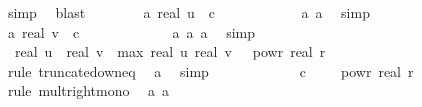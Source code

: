 \begin{isabellebody}
\ simp\ \isamarkupfalse%
\ blast\isanewline
\isanewline
\ \ \ \ \ \ \isamarkupfalse%
\ a{\isacharunderscore}{\kern0pt}{}{\isacharcolon}{\kern0pt}\ {\isachardoublequoteopen}real\ u\ {\isasymle}\ c\ {\isacharasterisk}{\kern0pt}\ {}{\isachardoublequoteclose}\isanewline
\ \ \ \ \ \ \ \ \isamarkupfalse%
\ a{\isacharunderscore}{\kern0pt}{}\ a{\isacharunderscore}{\kern0pt}{}\ \isamarkupfalse%
\ simp\isanewline
\ \ \ \ \ \ \isamarkupfalse%
\ a{\isacharunderscore}{\kern0pt}{}{\isacharcolon}{\kern0pt}\ {\isachardoublequoteopen}real\ v\ {\isasymle}\ c\ {\isacharasterisk}{\kern0pt}\ {}{\isachardoublequoteclose}\ \isanewline
\ \ \ \ \ \ \ \ \isamarkupfalse%
\ a{\isacharunderscore}{\kern0pt}{}\ a{\isacharunderscore}{\kern0pt}{}\ a{\isacharunderscore}{\kern0pt}{}\ \isamarkupfalse%
\ simp\isanewline
\ \ \ \ \ \ \isamarkupfalse%
\ {\isachardoublequoteopen}\ {\isasymbar}real\ u\ {\isacharminus}{\kern0pt}\ real\ v{\isasymbar}\ {\isasymle}\ {\isacharparenleft}{\kern0pt}max\ {\isasymbar}real\ u{\isasymbar}\ {\isasymbar}real\ v{\isasymbar}{\isacharparenright}{\kern0pt}\ {\isacharasterisk}{\kern0pt}\ {}\ powr\ {\isacharparenleft}{\kern0pt}{\isacharminus}{\kern0pt}real\ r{\isacharparenright}{\kern0pt}{\isachardoublequoteclose}\isanewline
\ \ \ \ \ \ \ \ \isamarkupfalse%
\ {\isacharparenleft}{\kern0pt}rule\ truncate{\isacharunderscore}{\kern0pt}down{\isacharunderscore}{\kern0pt}eq{\isacharparenright}{\kern0pt}\ \isamarkupfalse%
\ a{\isacharunderscore}{\kern0pt}{}\ \isamarkupfalse%
\ simp\ \isanewline
\ \ \ \ \ \ \isamarkupfalse%
\ \isamarkupfalse%
\ {\isachardoublequoteopen}{\isachardot}{\kern0pt}{\isachardot}{\kern0pt}{\isachardot}{\kern0pt}\ {\isasymle}\ {\isacharparenleft}{\kern0pt}c\ {\isacharasterisk}{\kern0pt}\ {}{\isacharparenright}{\kern0pt}\ {\isacharasterisk}{\kern0pt}\ {}\ powr\ {\isacharparenleft}{\kern0pt}{\isacharminus}{\kern0pt}real\ r{\isacharparenright}{\kern0pt}{\isachardoublequoteclose}\isanewline
\ \ \ \ \ \ \ \ \isamarkupfalse%
\ {\isacharparenleft}{\kern0pt}rule\ mult{\isacharunderscore}{\kern0pt}right{\isacharunderscore}{\kern0pt}mono{\isacharparenright}{\kern0pt}\ \isamarkupfalse%
\ a{\isacharunderscore}{\kern0pt}{}\ a{\isacharunderscore}{\kern0pt}{}\ \isamarkupfalse%

\end{isabellebody}
